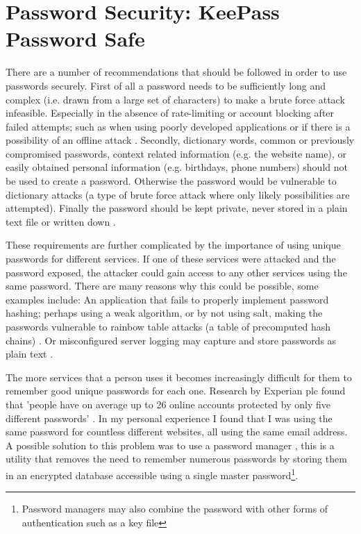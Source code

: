 \documentclass[11pt,a4paper]{scrartcl}
\begin{document}
	
\section*{Password Security: KeePass Password Safe}
\begin{refsection}

There are a number of recommendations that should be followed in order to use passwords securely. 
First of all a password needs to be sufficiently long and complex (i.e. drawn from a large set of characters) to make a brute force attack infeasible. Especially in the absence of rate-limiting or account blocking after failed attempts; such as when using poorly developed applications or if there is a possibility of an offline attack \cite{nist_password_2017}.
Secondly, dictionary words, common or previously compromised passwords, context related information (e.g. the website name), or easily obtained personal information (e.g. birthdays, phone numbers) should not be used to create a password. Otherwise the password would be vulnerable to dictionary attacks (a type of brute force attack where only likely possibilities are attempted).
Finally the password should be kept private, never stored in a plain text file or written down \cite{cern_computer_security_information}.

These requirements are further complicated by the importance of using unique passwords for different services. If one of these services were attacked and the password exposed, the attacker could gain access to any other services using the same password. There are many reasons why this could be possible, some examples include: An application that fails to properly implement password hashing; perhaps using a weak algorithm, or by not using salt, making the passwords vulnerable to rainbow table attacks (a table of precomputed hash chains) \cite{linkedin_leak}. Or misconfigured server logging may capture and store passwords as plain text  \cite{github_logs,twitter_logs}.

The more services that a person uses it becomes increasingly difficult for them to remember good unique passwords for each one.
Research by Experian plc found that 'people have on average up to 26 online accounts protected by only five different passwords' \cite{experian_2016}.
In my personal experience I found that I was using the same password for countless different websites, all using the same email address. 
A possible solution to this problem was to use a password manager \cite{ncsc_pass_managers}, this is a utility that removes the need to remember numerous passwords by storing them in an encrypted database accessible using a single master password\footnote{Password managers may also combine the password with other forms of authentication such as a key file}.


\end{refsection}
\end{document}
